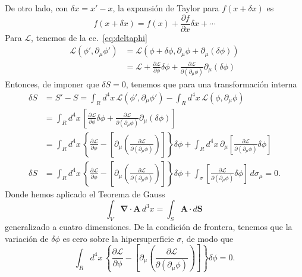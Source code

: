 De otro lado, con $\delta x=x'-x$, la expansi\'on de Taylor para $f(x+\delta x)$ es
\begin{equation}
  f(x+\delta x)=f(x)+\frac{\partial f}{\partial x}\delta x+\cdots 
\end{equation}
Para $\mathcal{L}$, tenemos de la ec.~\eqref{eq:deltaphi}
\begin{align}
  \mathcal{L}(\phi',\partial_\mu\phi')&=\mathcal{L}(\phi+\delta\phi,\partial_\mu\phi+\partial_\mu(\delta\phi))\nonumber\\
  &=\mathcal{L}+\frac{\partial\mathcal{L}}{\partial\phi}\delta\phi+\frac{\partial\mathcal{L}}{\partial(\partial_\mu\phi)}\partial_\mu(\delta\phi)
\end{align}
Entonces, de imponer que $\delta S=0$, tenemos que para una transformación interna
\begin{align}
  \delta S&=S'-S=\int_{R}d^4x\,\mathcal{L}(\phi',\partial_\mu\phi')-\int_{R}d^4x\,\mathcal{L}(\phi,\partial_\mu\phi)\nonumber\\
&=\int_{R}d^4x\,
\left[
\frac{\partial\mathcal{L}}{\partial\phi}\delta\phi+\frac{\partial\mathcal{L}}{\partial(\partial_\mu\phi)}\partial_\mu(\delta\phi)
\right]\nonumber\\
 &=\int_{R}d^4x\,
  \left\{ 
    \frac{\partial\mathcal{L}}{\partial\phi}-\left[\partial_\mu\left(
      \frac{\partial\mathcal{L}}{\partial(\partial_\mu\phi)}
    \right)\right]
  \right\}\delta\phi+\int_{R}d^4x\,
    \partial_\mu\left[
      \frac{\partial\mathcal{L}}{\partial(\partial_\mu\phi)}\delta\phi
    \right]\nonumber\\
\label{eq:1}
\delta S&=\int_{R}d^4x\,
  \left\{ 
    \frac{\partial\mathcal{L}}{\partial\phi}-    
    \left[\partial_\mu\left(
      \frac{\partial\mathcal{L}}{\partial(\partial_\mu\phi)}
    \right)\right]
  \right\}\delta\phi+\int_{\sigma}\left[
      \frac{\partial\mathcal{L}}{\partial(\partial_\mu\phi)}\delta\phi
    \right]\,d\sigma_\mu=0.
\end{align}
Donde hemos aplicado el Teorema de Gauss
\begin{equation}
\int_V\boldsymbol{\nabla}\cdot\mathbf{A}\,d^3x=
 \int_S\mathbf{A}\cdot d\mathbf{S}\,
\end{equation}
generalizado a cuatro dimensiones. De la condición de frontera, tenemos que la variaci\'on de $\delta\phi$ es cero sobre la hipersuperficie $\sigma$, de modo que
\begin{equation}
  \int_{R}d^4x\,
  \left\{ 
    \frac{\partial\mathcal{L}}{\partial\phi}-
   \left[\partial_\mu\left(
      \frac{\partial\mathcal{L}}{\partial(\partial_\mu\phi)}
    \right)\right]
  \right\}\delta\phi=0.
\end{equation}

